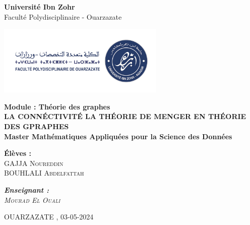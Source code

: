 \documentclass[12pt,a4paper,oneside]{report}
\begin{document}
\begin{titlepage}
 
\begin{center}
 
 {\huge \bf Université Ibn Zohr }\\
\vspace{1cm}
{\Large Faculté Polydisciplinaire - Ouarzazate}\\ 



\begin{center}
    \includegraphics[width=0.6\textwidth]{Assets/fpo_logo.png}
\end{center}

\vspace{1cm}
{\bf \large Module : Théorie des graphes}\\[2.5cm] 

{\bf \large LA CONNÉCTIVITÉ LA THÉORIE DE MENGER EN THÉORIE DES GPRAPHES}\\[1cm]

{\bf \large Master Mathématiques Appliquées pour la Science des Données}\\[0.5cm] 

\vspace{1cm}

\textbf{Élèves :}\\
\textsc{GAJJA Noureddin}  \\
\textsc{BOUHLALI Abdelfattah}  %

\vspace{1cm}

\emph{\textbf{Enseignant :}\\  
\textsc{Mourad El Ouali} } %

\vspace{1cm}
\date{\today}
{\large OUARZAZATE ,    03-05-2024}\\[0.2cm] 
\end{center}

\end{titlepage}

\newpage
\newpage
\end{document}
